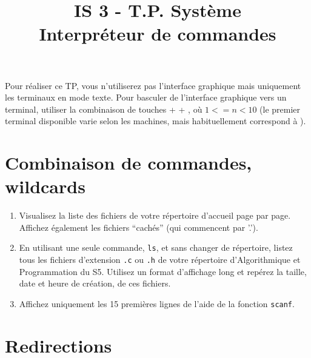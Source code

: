 \documentclass[a4paper]{article}
\title{\textbf{IS 3 - T.P. Système\\Interpréteur de commandes}}
\date{}
\begin{document}
\vspace{-4cm}
\maketitle


Pour réaliser ce TP, vous n'utiliserez pas l'interface graphique mais
uniquement les terminaux en mode texte. Pour basculer de l'interface
graphique vers un terminal, utiliser la combinaison de touches \Ctrl +
\Alt + , où $1<=n<10$ (le premier terminal disponible
varie selon les machines, mais habituellement correspond à
).

\section{Combinaison de commandes, wildcards}

\begin{enumerate}
\item Visualisez la liste des fichiers de votre répertoire d'accueil
  page par page. Affichez également les fichiers ``cachés'' (qui
  commencent par '.').
\item En utilisant une seule commande, \texttt{ls}, et sans changer de
  répertoire, listez tous les fichiers d'extension \texttt{.c} ou
  \texttt{.h} de votre répertoire d'Algorithmique et Programmation du
  S5. Utilisez un format d'affichage long et repérez la taille, date
  et heure de création, de ces fichiers.
\item Affichez uniquement les 15 premières lignes de l'aide de la
  fonction \texttt{scanf}.
\end{enumerate}

\section{Redirections}
\end{document}
